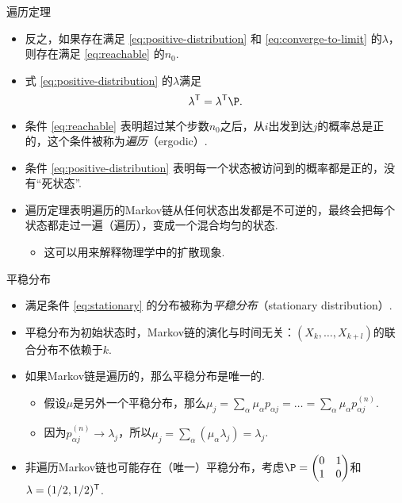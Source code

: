 \begin{frame}{遍历定理}
\begin{theorem}[遍历定理，续]
\begin{itemize}
    \item 反之，如果存在满足 \eqref{eq:positive-distribution} 和 \eqref{eq:converge-to-limit} 的$\lambda$，则存在满足 \eqref{eq:reachable} 的$n_0$.
    \item 式 \eqref{eq:positive-distribution} 的$\lambda$满足
    \begin{equation}
        \lambda^\t = \lambda^\t\P.\label{eq:stationary}
    \end{equation}
\end{itemize}
\end{theorem}
\begin{itemize}
    \item 条件 \eqref{eq:reachable} 表明超过某个步数$n_0$之后，从$i$出发到达$j$的概率总是正的，这个条件被称为\emph{遍历}（ergodic）.
    \item 条件 \eqref{eq:positive-distribution} 表明每一个状态被访问到的概率都是正的，没有``死状态''.
    \item 遍历定理表明遍历的Markov链从任何状态出发都是不可逆的，最终会把每个状态都走过一遍（遍历），变成一个混合均匀的状态.
    \begin{itemize}
        \item 这可以用来解释物理学中的扩散现象. %
    \end{itemize}
\end{itemize}
\end{frame}

\begin{frame}{平稳分布}
\begin{itemize}
    \item 满足条件 \eqref{eq:stationary} 的分布被称为\emph{平稳分布}（stationary distribution）.
    \item 平稳分布为初始状态时，Markov链的演化与时间无关：$(X_k,\dots,X_{k+l})$的联合分布不依赖于$k$.
    \item 如果Markov链是遍历的，那么平稳分布是唯一的.
    \begin{itemize}
        \item 假设$\mu$是另外一个平稳分布，那么$\mu_j=\sum_\alpha\mu_\alpha p_{\alpha j}=\dots=\sum_{\alpha}\mu_\alpha p_{\alpha j}^{(n)}$.
        \item 因为$p_{\alpha j}^{(n)}\to \lambda_j$，所以$\mu_j=\sum_{\alpha} (\mu_\alpha\lambda_j)=\lambda_j$.
    \end{itemize}
    \item 非遍历Markov链也可能存在（唯一）平稳分布，考虑$\P=\begin{pmatrix}0&1\\1&0\end{pmatrix}$和$\lambda=(1/2,1/2)^{\mathsf{T}}$.
\end{itemize}
\end{frame}

